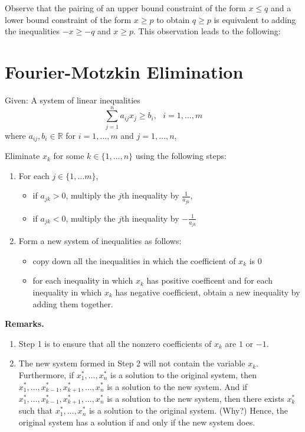 \documentclass[]{book}
\providecommand{\tightlist}{%
  \setlength{\itemsep}{0pt}\setlength{\parskip}{0pt}}
\def\lt{<}
\def\gt{>}
\theoremstyle{definition}
\theoremstyle{definition}
\theoremstyle{remark}
\begin{document}
Observe that the pairing of an upper bound constraint of the form
\(x \leq q\) and a lower bound constraint of the form \(x \geq p\) to
obtain \(q \geq p\) is equivalent to adding the inequalities
\(-x \geq -q\) and \(x \geq p\). This observation leads to the
following:

\hypertarget{fm}{\section{Fourier-Motzkin Elimination}\label{fm}}

Given: A system of linear inequalities
\[ \sum_{j=1}^n a_{ij} x_j \geq b_i,~~~i = 1,\ldots,m\] where
\(a_{ij}, b_i \in \mathbb{R}\) for \(i = 1,\ldots,m\) and
\(j = 1,\ldots,n\),

Eliminate \(x_k\) for some \(k \in \{1,\ldots,n\}\) using the following
steps:

\begin{enumerate}
\def\labelenumi{\arabic{enumi}.}
\item
  For each \(j \in \{1,\ldots m\}\),

  \begin{itemize}
  \tightlist
  \item
    if \(a_{jk} \gt 0\), multiply the \(j\)th inequality by
    \(\frac{1}{a_{jk}}\),
  \item
    if \(a_{jk} \lt 0\), multiply the \(j\)th inequality by
    \(-\frac{1}{a_{jk}}\)
  \end{itemize}
\item
  Form a new system of inequalities as follows:

  \begin{itemize}
  \tightlist
  \item
    copy down all the inequalities in which the coefficient of \(x_k\)
    is 0
  \item
    for each inequality in which \(x_k\) has positive coefficent and for
    each inequality in which \(x_k\) has negative coefficient, obtain a
    new inequality by adding them together.
  \end{itemize}
\end{enumerate}

\textbf{Remarks.}

\begin{enumerate}
\def\labelenumi{\arabic{enumi}.}
\item
  Step 1 is to ensure that all the nonzero coefficients of \(x_k\) are
  \(1\) or \(-1\).
\item
  The new system formed in Step 2 will not contain the variable \(x_k\).
  Furthermore, if \(x_1^*,\ldots, x_n^*\) is a solution to the original
  system, then \(x_1^*,\ldots,x_{k-1}^*, x_{k+1}^*,\ldots, x_n^*\) is a
  solution to the new system. And if
  \(x_1^*,\ldots,x_{k-1}^*, x_{k+1}^*,\ldots, x_n^*\) is a solution to
  the new system, then there exists \(x_k^*\) such that
  \(x_1^*,\ldots, x_n^*\) is a solution to the original system. (Why?)
  Hence, the original system has a solution if and only if the new
  system does.
\end{enumerate}
\end{document}
